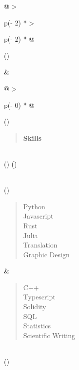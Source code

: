 \documentclass[
]{article}
\begin{document}
\begin{longtable}[]{@{}
  >{\raggedright\arraybackslash}p{(\columnwidth - 2\tabcolsep) * }
  >{\raggedright\arraybackslash}p{(\columnwidth - 2\tabcolsep) * }@{}}
\toprule()
\begin{minipage}[b]{\linewidth}\raggedright
\end{minipage} & \begin{minipage}[b]{\linewidth}\raggedright
\begin{longtable}[]{@{}
  >{\raggedright\arraybackslash}p{(\columnwidth - 0\tabcolsep) * }@{}}
\toprule()
\begin{minipage}[b]{\linewidth}\raggedright
\begin{quote}
\textbf{Skills}
\end{quote}
\end{minipage} \\
\midrule()
\endhead
\bottomrule()
\end{longtable}
\end{minipage} \\
\midrule()
\endhead
\begin{minipage}[t]{\linewidth}\raggedright
\begin{quote}
Python\\
Javascript\\
Rust\\
Julia\\
Translation\\
Graphic Design
\end{quote}\strut
\end{minipage} & \begin{minipage}[t]{\linewidth}\raggedright
\begin{quote}
C++\\
Typescript\\
Solidity\\
SQL\\
Statistics\\
Scientific Writing
\end{quote}\strut
\end{minipage} \\
\bottomrule()
\end{longtable}
\end{document}
